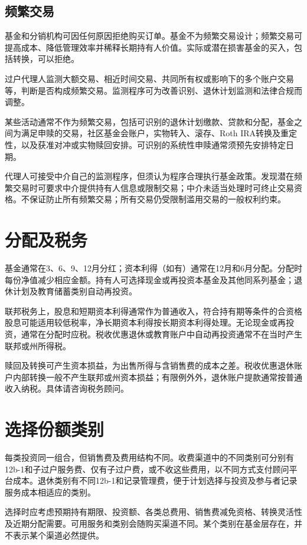 \documentclass[UTF8,fontset=none,11pt,a4paper]{ctexart}
\begin{document}
\subsection*{频繁交易}
基金和分销机构可因任何原因拒绝购买订单。基金不为频繁交易设计；频繁交易可提高成本、降低管理效率并稀释长期持有人价值。实际或潜在损害基金的买入，包括转换，\allowbreak\mbox{可以拒绝。}


过户代理人监测大额交易、相近时间交易、共同所有权或影响下的多个账户交易等，判断是否构成频繁交易。监测程序可为改善识别、退休计划监测和法律合\allowbreak\mbox{规而调整。}


某些活动通常不作为频繁交易，包括可识别的退休计划缴款、贷款和分配，基金之间为满足申赎的交易，社区基金会账户，实物转入、滚存、Roth IRA转换及重定性，以及获准对冲或实物赎回安排。可识别的系统性申赎通常须预先安排\allowbreak\mbox{特定日期。}


代理人可接受中介自己的监测程序，但须认为程序合理执行基金政策。发现潜在频繁交易时可要求中介提供持有人信息或限制交易；中介未适当处理时可终止交易资格。不保证防止所有频繁交易；所有交易仍受限制滥用交易的一般\allowbreak\mbox{权利约束。}


\section*{分配及税务}
基金通常在3、6、9、12月分红；资本利得（如有）通常在12月和6月分配。分配时每份净值减少相应金额。持有人可选择现金或再投资本基金及其他同系列基金；退休计划及教育储蓄类别自\allowbreak\mbox{动再投资。}


联邦税务上，股息和短期资本利得通常作为普通收入，符合持有期等条件的合资格股息可能适用较低税率，净长期资本利得按长期资本利得处理。无论现金或再投资，通常在分配时应税。税收优惠退休或教育账户中自动再投资通常不在当时产生联邦或\allowbreak\mbox{州所得税。}


赎回及转换可产生资本损益，为出售所得与含销售费的成本之差。税收优惠退休账户内部转换一般不产生联邦或州资本损益；有限例外外，退休账户提款通常按普通收入纳税。具体请咨询\allowbreak\mbox{税务顾问。}


\section*{选择份额类别}
每类投资同一组合，但销售费及费用结构不同。收费渠道中的不同类别可分别有12b-1和子过户服务费、仅有子过户费，或不收这些费用，以不同方式支付顾问平台成本。退休类别有不同12b-1和记录管理费，便于计划选择与投资及参与者记录服务成本相适\allowbreak\mbox{应的类别。}


选择时应考虑预期持有期限、投资额、各类总费用、销售费减免资格、转换灵活性及近期分配需要。可用服务和类别会随购买渠道不同。某个类别在基金层存在，并不表示某个渠道\allowbreak\mbox{必然提供。}
\end{document}
